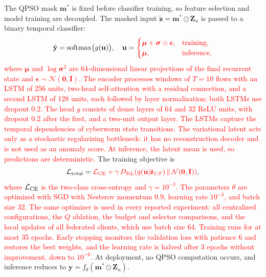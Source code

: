 \documentclass[conference]{IEEEtran}
\begin{document}
The QPSO mask $\mathbf{m}^{*}$ is fixed before classifier training,
so feature selection and model training are decoupled. The masked
input $\tilde{\mathbf{z}}=\mathbf{m}^{*}\odot\mathbf{Z}_n$ is passed
to a binary temporal classifier:
\begin{equation}
\hat{\mathbf{y}} = \mathrm{softmax}\bigl(g(\mathbf{u})\bigr),\quad
\mathbf{u} = \textcolor{red}{\begin{cases}
\boldsymbol{\mu}+\boldsymbol{\sigma}\odot\boldsymbol{\epsilon}, & \text{training},\\
\boldsymbol{\mu}, & \text{inference},
\end{cases}}
\label{eq:classifier}
\end{equation}
\textcolor{red}{where $\boldsymbol{\mu}$ and
$\log\boldsymbol{\sigma}^2$ are 64-dimensional linear projections of
the final recurrent state and
$\boldsymbol{\epsilon}\sim\mathcal{N}(\mathbf{0},\mathbf{I})$. The
encoder processes windows of $T=10$ flows with an LSTM of 256 units,
two-head self-attention with a residual connection, and a second LSTM
of 128 units, each followed by layer normalization; both LSTMs use
dropout 0.2. The head $g$ consists of dense layers of 64 and 32 ReLU
units, with dropout 0.2 after the first, and a two-unit output layer.
The LSTMs capture the temporal dependencies of cyberworm state
transitions. The variational latent acts only as a stochastic
regularizing bottleneck: it has no reconstruction decoder and is not
used as an anomaly score. At inference, the latent mean is used, so
predictions are deterministic.} The training objective is
\begin{equation}
\mathcal{L}_{\rm total} = \textcolor{red}{\mathcal{L}_{\rm CE}
+ \gamma\,D_{\rm KL}\!\left(q(\mathbf{u}|\tilde{\mathbf{z}}_{1:T})\,\|\,
\mathcal{N}(\mathbf{0},\mathbf{I})\right)},
\label{eq:total_loss}
\end{equation}
\textcolor{red}{where $\mathcal{L}_{\rm CE}$ is the
two-class cross-entropy and $\gamma=10^{-3}$.}
\textcolor{red}{The parameters $\theta$ are optimized with
SGD with Nesterov momentum 0.9, learning rate $10^{-3}$, and batch
size 32. The same optimizer is used in every reported experiment:
all centralized configurations, the $Q$ ablation, the budget and
selector comparisons, and the local updates of all federated clients,
which use batch size 64.} \textcolor{red}{Training runs
for at most 35 epochs. Early stopping monitors the validation loss
with patience 6 and restores the best weights, and the learning rate
is halved after 3 epochs without improvement, down to $10^{-6}$.}
At deployment, no QPSO computation occurs, and inference reduces to
$\hat{\mathbf{y}}=f_\theta(\mathbf{m}^{*}\odot\mathbf{Z}_n)$.
\end{document}
